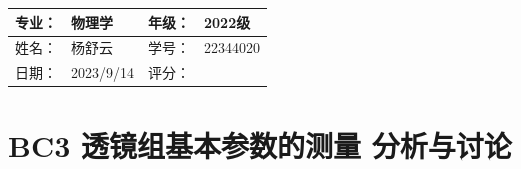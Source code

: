 \documentclass[dvipsnames, svgnames,a4paper,11pt]{article}
\begin{document}
	
	
	\clearpage
	\begin{table}
		\renewcommand\arraystretch{1.7}
		\begin{tabularx}{\textwidth}{|X|X|X|X|}
			\hline
			专业：& 物理学 &年级：& 2022级\\
			\hline
			姓名： & 杨舒云 & 学号：& 22344020\\
			\hline
			日期：& 2023/9/14 & 评分： &\\
			\hline
		\end{tabularx}
	\end{table}
	
	\section{BC3 透镜组基本参数的测量 \quad\heiti 分析与讨论}
\end{document}
